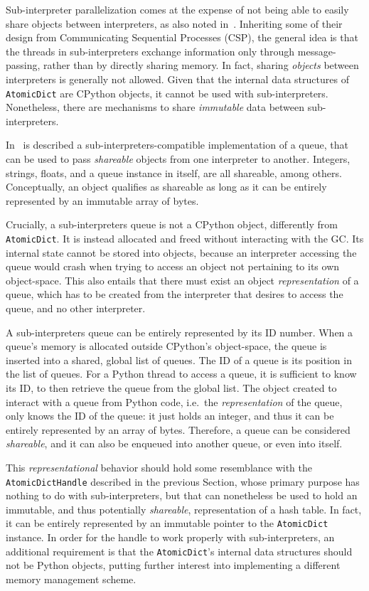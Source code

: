 Sub-interpreter parallelization comes at the expense of not being able to easily share objects between interpreters, as also noted in~\cite[{\S}Per-Interpreter GIL]{pep703}.
Inheriting some of their design from Communicating Sequential Processes (CSP), the general idea is that the threads in sub-interpreters exchange information only through message-passing, rather than by directly sharing memory.
In fact, sharing \emph{objects} between interpreters is generally not allowed.
Given that the internal data structures of \texttt{AtomicDict} are CPython objects, it cannot be used with sub-interpreters.
Nonetheless, there are mechanisms to share \emph{immutable} data between sub-interpreters.

In~\cite[\S Queue Objects]{pep734} is described a sub-interpreters-compatible implementation of a queue, that can be used to pass \emph{shareable} objects from one interpreter to another.
Integers, strings, floats, and a queue instance in itself, are all shareable, among others.
Conceptually, an object qualifies as shareable as long as it can be entirely represented by an immutable array of bytes.

Crucially, a sub-interpreters queue is not a CPython object, differently from \texttt{AtomicDict}.
It is instead allocated and freed without interacting with the GC\@.
Its internal state cannot be stored into objects, because an interpreter accessing the queue would crash when trying to access an object not pertaining to its own object-space.
This also entails that there must exist an object \emph{representation} of a queue, which has to be created from the interpreter that desires to access the queue, and no other interpreter.

A sub-interpreters queue can be entirely represented by its ID number.
When a queue's memory is allocated outside CPython's object-space, the queue is inserted into a shared, global list of queues.
The ID of a queue is its position in the list of queues.
For a Python thread to access a queue, it is sufficient to know its ID, to then retrieve the queue from the global list.
The object created to interact with a queue from Python code, i.e.\ the \emph{representation} of the queue, only knows the ID of the queue: it just holds an integer, and thus it can be entirely represented by an array of bytes.
Therefore, a queue can be considered \emph{shareable}, and it can also be enqueued into another queue, or even into itself.

This \emph{representational} behavior should hold some resemblance with the \texttt{AtomicDictHandle} described in the previous Section, whose primary purpose has nothing to do with sub-interpreters, but that can nonetheless be used to hold an immutable, and thus potentially \emph{shareable}, representation of a hash table.
In fact, it can be entirely represented by an immutable pointer to the \texttt{AtomicDict} instance.
In order for the handle to work properly with sub-interpreters, an additional requirement is that the \texttt{AtomicDict}'s internal data structures should not be Python objects, putting further interest into implementing a different memory management scheme.

